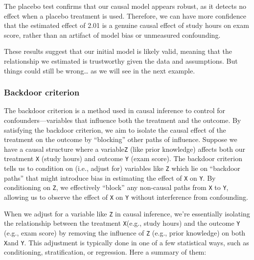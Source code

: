 \documentclass[
  12pt,
]{book}
\begin{document}
The placebo test confirms that our causal model appears robust, as it detects no effect when a placebo treatment is used. Therefore, we can have more confidence that the estimated effect of 2.01 is a genuine causal effect of study hours on exam score, rather than an artifact of model bias or unmeasured confounding.

These results suggest that our initial model is likely valid, meaning that the relationship we estimated is trustworthy given the data and assumptions. But things could still be wrong\ldots{} as we will see in the next example.

\subsubsection{Backdoor criterion}\label{backdoor-criterion}

The backdoor criterion is a method used in causal inference to control for confounders---variables that influence both the treatment and the outcome. By satisfying the backdoor criterion, we aim to isolate the causal effect of the treatment on the outcome by ``blocking'' other paths of influence. Suppose we have a causal structure where a variable\texttt{Z} (like prior knowledge) affects both our treatment \texttt{X} (study hours) and outcome \texttt{Y} (exam score). The backdoor criterion tells us to condition on (i.e., adjust for) variables like \texttt{Z} which lie on ``backdoor paths'' that might introduce bias in estimating the effect of \texttt{X} on \texttt{Y}. By conditioning on \texttt{Z}, we effectively ``block'' any non-causal paths from \texttt{X} to \texttt{Y}, allowing us to observe the effect of \texttt{X} on \texttt{Y} without interference from confounding.

When we adjust for a variable like \texttt{Z} in causal inference, we're essentially isolating the relationship between the treatment \texttt{X}(e.g., study hours) and the outcome \texttt{Y} (e.g., exam score) by removing the influence of \texttt{Z} (e.g., prior knowledge) on both \texttt{X}and \texttt{Y}. This adjustment is typically done in one of a few statistical ways, such as conditioning, stratification, or regression. Here a summary of them:
\end{document}
